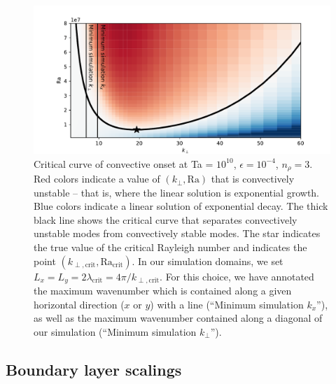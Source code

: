\begin{figure}[t!]
\includegraphics[width=\textwidth]{./figs/revisions/crit_curve_ta1e10.pdf}
\caption[Critical Rayleigh number curve for a rotating, polytropic atmosphere.]{ 
	Critical curve of convective onset at Ta = $10^{10}$, $\epsilon = 10^{-4}$, $n_\rho = 3$.
	Red colors indicate a value of $(k_\perp, \text{Ra})$ that is convectively unstable -- that is, where the linear solution is exponential growth.
	Blue colors indicate a linear solution of exponential decay.
	The thick black line shows the critical curve that separates convectively unstable modes from convectively stable modes.
	The star indicates the true value of the critical Rayleigh number and indicates the point $(k_{\perp, \text{crit}}, \text{Ra}_{\text{crit}})$.
	In our simulation domains, we set $L_x = L_y = 2 \lambda_\text{crit} = 4\pi / k_{\perp, \text{crit}}$.
	For this choice, we have annotated the maximum wavenumber which is contained along a given horizontal direction ($x$ or $y$) with a line (``Minimum simulation $k_x$''), as well as the maximum wavenumber contained along a diagonal of our simulation (``Minimum simulation $k_\perp$'').
	\label{fig:ta1e10_onset} }
\end{figure}

\subsection{Boundary layer scalings}


